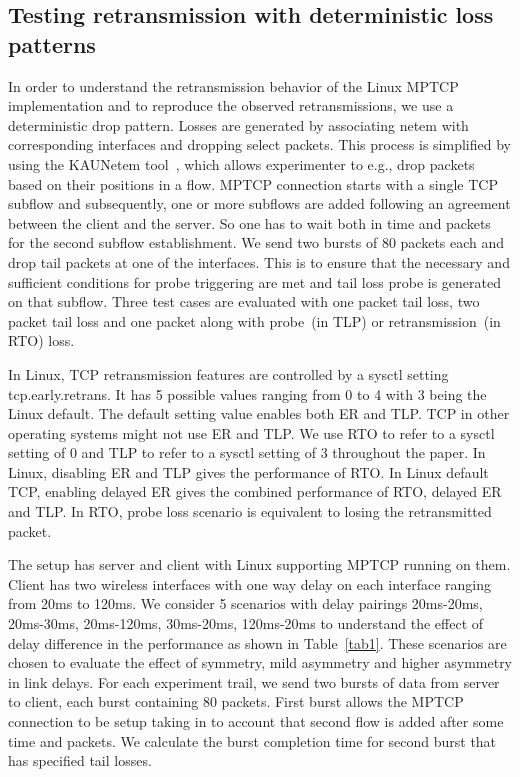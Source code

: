 \documentclass[10pt,conference,compsoc]{IEEEtran}
\begin{document}
\subsection{Testing retransmission with deterministic loss patterns}
In order to understand the retransmission behavior of the Linux MPTCP implementation and to reproduce the observed retransmissions, we use a deterministic drop pattern.
Losses are generated by associating netem with corresponding interfaces and dropping select packets. This process is simplified by using the KAUNetem tool~\cite{Garcia2016}, which allows experimenter to e.g., drop packets based on their positions in a flow. MPTCP connection starts with a single TCP subflow and subsequently, one or more subflows are added following an agreement between the client and the server. So one has to wait both in time and packets for the second subflow establishment. We send two bursts of 80 packets each and drop tail packets at one of the interfaces. This is to ensure that the necessary and sufficient conditions for probe triggering are met and tail loss probe is generated on that
subflow. Three test cases are evaluated with one packet tail loss, two packet tail loss and one packet along with probe~(in TLP) or retransmission~(in RTO) loss. 

In Linux, TCP retransmission features are controlled by a sysctl setting tcp.early.retrans. It has 5 possible values ranging from 0 to 4 with 3 being the Linux default. The default setting value enables both
ER and TLP. TCP in other operating systems might not use ER and TLP. We use RTO to refer to a sysctl setting of 0 and TLP to refer to a sysctl setting of 3 throughout the paper.
In Linux, disabling ER and TLP gives the performance of RTO. In Linux default TCP, enabling delayed ER gives the combined performance of RTO, delayed ER and TLP.
In RTO, probe loss scenario is equivalent to losing the retransmitted packet.

The setup has server and client with Linux supporting MPTCP running on them. Client has two wireless interfaces with one way delay on each interface ranging from 20ms to 120ms. We consider 5 scenarios with delay pairings 20ms-20ms, 20ms-30ms, 20ms-120ms, 30ms-20ms, 120ms-20ms to understand the effect of delay difference in the performance as shown in Table~\ref{tab1}. These scenarios are chosen to evaluate the effect of symmetry, mild asymmetry and higher asymmetry in link delays. For each experiment trail, we send two bursts of data from server to client, each burst containing 80 packets. First burst allows the MPTCP connection to be setup taking in to account that second flow is added after some time and packets. We calculate the burst completion time for second burst that has specified tail losses.
\end{document}
